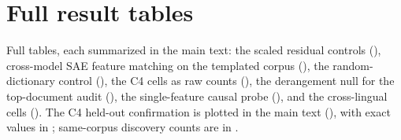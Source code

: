 \section{Full result tables}\label{app:tables}

Full tables, each summarized in the main text: the scaled residual controls
(), cross-model SAE feature matching on the templated corpus
(), the random-dictionary control (), the C4
cells as raw counts (), the derangement null for the top-document audit
(), the single-feature causal probe (), and the
cross-lingual cells (). The C4 held-out confirmation is plotted in the
main text (), with exact values in ; same-corpus discovery counts are in .



